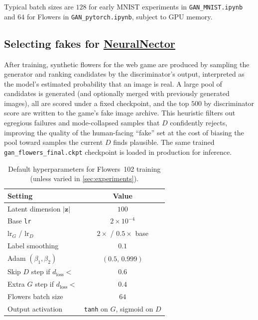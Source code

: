 \documentclass{article}
\theoremstyle{plain}
\theoremstyle{definition}
\theoremstyle{remark}
\begin{document}
Typical batch sizes are $128$ for early MNIST experiments in \texttt{GAN\_MNIST.ipynb} and $64$ for Flowers in \texttt{GAN\_pytorch.ipynb}, subject to GPU memory.

\subsection{Selecting fakes for \underline{\href{https://neuralnector.issacroy.com}{NeuralNector}}}

After training, synthetic flowers for the web game are produced by sampling the generator and ranking candidates by the discriminator's output, interpreted as the model's estimated probability that an image is real. A large pool of candidates is generated (and optionally merged with previously generated images), all are scored under a fixed checkpoint, and the top $500$ by discriminator score are written to the game's fake image archive. This heuristic filters out egregious failures and mode-collapsed samples that $D$ confidently rejects, improving the quality of the human-facing ``fake'' set at the cost of biasing the pool toward samples the current $D$ finds plausible. The same trained \texttt{gan\_flowers\_final.ckpt} checkpoint is loaded in production for inference.

\begin{table}[t]
\caption{Default hyperparameters for Flowers~102 training (unless varied in \cref{sec:experiments}).}
\label{tab:hparams}
\vskip 0.1in
\begin{center}
\begin{small}
\begin{sc}
\begin{tabular}{lc}
\toprule
Setting & Value \\
\midrule
Latent dimension $|\mathbf{z}|$ & $100$ \\
Base \texttt{lr} & $2\times 10^{-4}$ \\
$\mathrm{lr}_G$ / $\mathrm{lr}_D$ & $2\times$ / $0.5\times$ base \\
Label smoothing & $0.1$ \\
Adam $(\beta_1,\beta_2)$ & $(0.5,\,0.999)$ \\
Skip $D$ step if $d_{\mathrm{loss}}<$ & $0.6$ \\
Extra $G$ step if $d_{\mathrm{loss}}<$ & $0.4$ \\
Flowers batch size & $64$ \\
Output activation & \texttt{tanh} on $G$, sigmoid on $D$ \\
\bottomrule
\end{tabular}
\end{sc}
\end{small}
\end{center}
\vskip -0.1in
\end{table}
\end{document}
